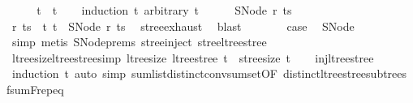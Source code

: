 \begin{isabellebody}
\ \ \isamarkupfalse%
\ \isamarkupfalse%
\ {\isachardoublequoteopen}t{}\ {\isacharequal}{\kern0pt}\ t{}{\isachardoublequoteclose}\isanewline
\ \ \isamarkupfalse%
\ {\isacharparenleft}{\kern0pt}induction\ t{}\ arbitrary{\isacharcolon}{\kern0pt}\ t{}{\isacharparenright}{\kern0pt}\isanewline
\ \ \ \ \isamarkupfalse%
\ {\isacharparenleft}{\kern0pt}SNode\ r{}\ ts{}{\isacharparenright}{\kern0pt}\isanewline
\ \ \ \ \isamarkupfalse%
\ r{}\ ts{}\ \ t{}{\isacharcolon}{\kern0pt}\ {\isachardoublequoteopen}t{}\ {\isacharequal}{\kern0pt}\ SNode\ r{}\ ts{}{\isachardoublequoteclose}\ \isamarkupfalse%
\ stree{\isachardot}{\kern0pt}exhaust\ \isamarkupfalse%
\ blast\isanewline
\ \ \ \ \isamarkupfalse%
\ \isamarkupfalse%
\ {\isacharquery}{\kern0pt}case\ \isamarkupfalse%
\ SNode\ \isamarkupfalse%
\ {\isacharparenleft}{\kern0pt}simp{\isacharcomma}{\kern0pt}\ metis\ SNode{\isachardot}{\kern0pt}prems\ stree{\isachardot}{\kern0pt}inject\ stree{\isacharunderscore}{\kern0pt}ltree{\isacharunderscore}{\kern0pt}stree{\isacharparenright}{\kern0pt}\isanewline
\ \ \isamarkupfalse%
\isanewline
{}\isamarkupfalse%
%
\endisatagproof
{\isafoldproof}%
%
\isadelimproof
\isanewline
%
\endisadelimproof
\isanewline
{}\isamarkupfalse%
\ ltree{\isacharunderscore}{\kern0pt}size{\isacharunderscore}{\kern0pt}ltree{\isacharunderscore}{\kern0pt}stree{\isacharbrackleft}{\kern0pt}simp{\isacharbrackright}{\kern0pt}{\isacharcolon}{\kern0pt}\ {\isachardoublequoteopen}ltree{\isacharunderscore}{\kern0pt}size\ {\isacharparenleft}{\kern0pt}ltree{\isacharunderscore}{\kern0pt}stree\ t{\isacharparenright}{\kern0pt}\ {\isacharequal}{\kern0pt}\ stree{\isacharunderscore}{\kern0pt}size\ t{\isachardoublequoteclose}\isanewline
%
\isadelimproof
\ \ %
\endisadelimproof
%
\isatagproof
{}\isamarkupfalse%
\ inj{\isacharunderscore}{\kern0pt}ltree{\isacharunderscore}{\kern0pt}stree\ \isamarkupfalse%
\ {\isacharparenleft}{\kern0pt}induction\ t{\isacharparenright}{\kern0pt}\ {\isacharparenleft}{\kern0pt}auto\ simp{\isacharcolon}{\kern0pt}\ sum{\isacharunderscore}{\kern0pt}list{\isacharunderscore}{\kern0pt}distinct{\isacharunderscore}{\kern0pt}conv{\isacharunderscore}{\kern0pt}sum{\isacharunderscore}{\kern0pt}set{\isacharbrackleft}{\kern0pt}OF\ distinct{\isacharunderscore}{\kern0pt}ltree{\isacharunderscore}{\kern0pt}stree{\isacharunderscore}{\kern0pt}subtrees{\isacharbrackright}{\kern0pt}\ fsum{\isachardot}{\kern0pt}F{\isachardot}{\kern0pt}rep{\isacharunderscore}{\kern0pt}eq{\isacharcomma}{\kern0pt}\isanewline

\end{isabellebody}

